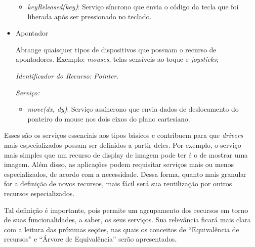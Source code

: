 \begin{itemize}
\begin{itemize}
			\item \emph{keyReleased(key)}: Serviço síncrono que envia o código da tecla que foi liberada após ser pressionado no teclado.
		\end{itemize}

	\item Apontador
		
		Abrange quaisquer tipos de dispositivos que possuam o recurso de apontadores. Exemplo: \emph{mouses}, telas sensíveis ao toque e \emph{joysticks};

		\emph{Identificador do Recurso:} \emph{Pointer}.

		\emph{Serviço:}
		\begin{itemize}
			\item \emph{move(dx, dy)}: Serviço assíncrono que envia dados de deslocamento do ponteiro do mouse nos dois eixos do plano cartesiano.
		\end{itemize}

\end{itemize}

Esses são os serviços essenciais aos tipos básicos e contribuem para que \emph{drivers} mais especializados possam ser definidos a partir deles. Por exemplo, o serviço mais simples que um recurso de display de imagem pode ter é o de mostrar uma imagem. Além disso, as aplicações podem requisitar serviços mais ou menos especializados, de acordo com a necessidade. Dessa forma, quanto mais granular for a definição de novos recursos, mais fácil será sua reutilização por outros recursos especializados. 

Tal definição é importante, pois permite um agrupamento dos recursos em torno de suas funcionalidades, a saber, os seus serviços. Sua relevância ficará mais clara com a leitura das próximas seções, nas quais os conceitos de ``Equivalência de recursos'' e ``Árvore de Equivalência'' serão apresentados.




